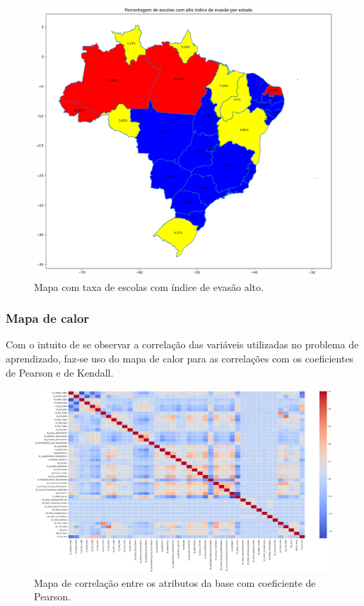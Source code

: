 \begin{figure}
    \centering
    \includegraphics[scale = 0.3]{Graphics/Mapa.png}
    \caption{Mapa com taxa de escolas com índice de evasão alto.}
    \label{fig:enter-label}
\end{figure}

\subsubsection{Mapa de calor}

\par Com o intuito de se observar a correlação das variáveis utilizadas no problema de aprendizado, faz-se uso do mapa de calor para as correlações com os coeficientes de Pearson e de Kendall.

\begin{figure}[H]
    \centering
    \includegraphics[scale = 0.25]{Graphics/Heatmap-Pearson.png}
    \caption{Mapa de correlação entre os atributos da base com coeficiente de Pearson.}
    \label{fig:heatmap}
\end{figure}

